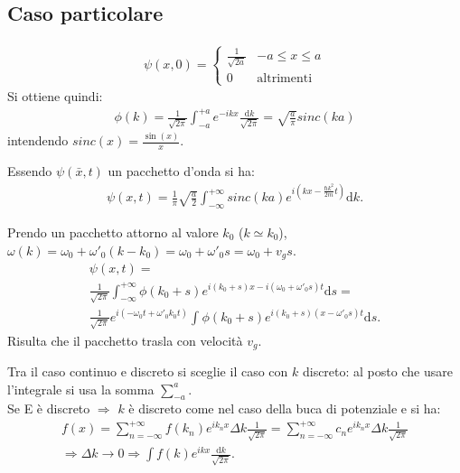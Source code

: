 \subsection{Caso particolare} %
\begin{equation}\begin{split}
\psi \left(x,0\right)=\begin{cases}
\frac{1}{\sqrt{2a}} & -a\le x\le a \\
0 & \textrm{altrimenti}
\end{cases}
\end{split}\end{equation}
Si ottiene quindi:
\begin{equation}\begin{split}
\phi \left(k\right)=\frac{1}{\sqrt{2\pi}}\int_{-a}^{+a}{e^{-ikx} \frac{\textrm{d}k}{\sqrt{2\pi}}}=\sqrt{\frac{a}{\pi}}sinc\left(ka\right)
\end{split}\end{equation}
intendendo $sinc\left(x\right)=\frac{\sin{\left(x\right)}}{x}$.

Essendo $\psi\left(\bar x, t\right)$ un pacchetto d'onda si ha:
\begin{equation}\begin{split}
\psi \left(x,t\right)=\frac{1}{\pi}\sqrt{\frac{a}{2}}\int_{-\infty }^{+\infty }{sinc\left(ka\right)e^{i\left(kx-\frac{\hbar k^2}{2m}t\right)} \textrm{d}k}.
\end{split}\end{equation}

Prendo un pacchetto attorno al valore $k_0$ ($k\simeq k_0$), $\omega \left(k\right)=\omega _0+\omega '_0\left(k-k_0\right)=\omega _0+\omega '_0s=\omega _0+v_gs$.
\begin{equation}\begin{split}
\psi \left(x,t\right)=\\
\frac{1}{\sqrt{2\pi }}\int_{-\infty }^{+\infty }{\phi\left(k_0+s\right) e^{i\left(k_0+s\right)x-i\left(\omega _0+\omega '_0s \right)t} \textrm{d}s}=\\
\frac{1}{\sqrt{2\pi }}e^{i\left(-\omega _0t+\omega '_0k_0t\right)}\int_{}^{}{\phi\left(k_0+s\right)e^{i\left(k_0+s\right)\left(x-\omega '_0s\right)t} \textrm{d}s}.
\end{split}\end{equation}
Risulta che il pacchetto trasla con velocità $v_g$.

Tra il caso continuo e discreto si sceglie il caso con $k$ discreto: al posto che usare l'integrale si usa la somma $\sum_{-a}^{a}$.
\\ Se E è discreto $\Longrightarrow $ $k$ è discreto come nel caso della buca di potenziale e si ha:
\begin{equation}\begin{split}
f\left(x\right)=\sum_{n=-\infty}^{+\infty}{f\left(k_n\right)e^{ik_nx}\Delta k\frac{1}{\sqrt{2\pi}}}=\sum_{n=-\infty}^{+\infty}{c_ne^{ik_nx}\Delta k\frac{1}{\sqrt{2\pi}}}\\
\Longrightarrow \Delta k \to 0 \Longrightarrow \int{f\left(k\right)e^{ikx}\frac{\textrm{d}k}{\sqrt{2\pi}}}.
\end{split}\end{equation}

